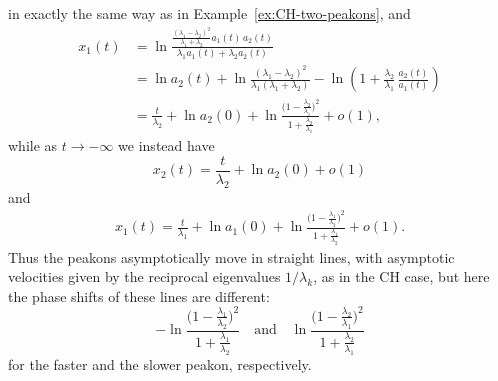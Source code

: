 \documentclass[10pt,a4paper]{article} \pdfoutput=1 
\begin{document}
\begin{example}
\begin{equation}
  \end{equation}
  in exactly the same way as in Example~\ref{ex:CH-two-peakons}, and
  \begin{equation}
    \begin{split}
      x_1(t)
      &
      = \ln \frac{\frac{(\lambda_1-\lambda_2)^2}{\lambda_1+\lambda_2} a_1(t) \, a_2(t)}{\lambda_1 a_1(t) + \lambda_2 a_2(t)}
      \\ &
      = \ln a_2(t)
      + \ln \frac{(\lambda_1-\lambda_2)^2}{\lambda_1 (\lambda_1 + \lambda_2)}
      - \ln \left( 1 + \frac{\lambda_2}{\lambda_1} \, \frac{a_2(t)}{a_1(t)} \right)
      \\ &
      = \frac{t}{\lambda_2} + \ln a_2(0)
      + \ln \frac{\bigl( 1 - \frac{\lambda_2}{\lambda_1} \bigr)^2}{1 + \frac{\lambda_2}{\lambda_1}}
      + o(1)
      ,
    \end{split}
  \end{equation}
  while as $t \to -\infty$ we instead have
  \begin{equation}
    x_2(t) = \frac{t}{\lambda_2} + \ln a_2(0) + o(1)
  \end{equation}
  and
  \begin{equation}
    \begin{split}
      x_1(t)
      = \frac{t}{\lambda_1} + \ln a_1(0)
      + \ln \frac{\bigl( 1 - \frac{\lambda_1}{\lambda_2} \bigr)^2}{1 + \frac{\lambda_1}{\lambda_2}}
      + o(1)
      .
    \end{split}
  \end{equation}
  Thus the peakons asymptotically move in straight lines,
  with asymptotic velocities given by the reciprocal eigenvalues $1/\lambda_k$,
  as in the CH case, but here the phase shifts of these lines are different:
  \begin{equation*}
    -\ln \frac{\bigl( 1 - \frac{\lambda_1}{\lambda_2} \bigr)^2}{1 + \frac{\lambda_1}{\lambda_2}}
    \quad\text{and}\quad
    \ln \frac{\bigl( 1 - \frac{\lambda_2}{\lambda_1} \bigr)^2}{1 + \frac{\lambda_2}{\lambda_1}}
  \end{equation*}
  for the faster and the slower peakon, respectively.
\end{example}
\end{document}
